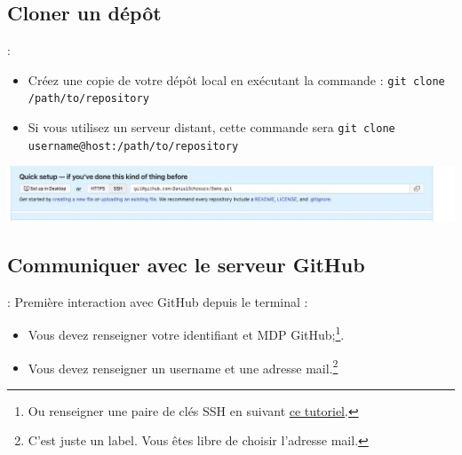 \documentclass[10pt]{beamer}
\begin{document}
\subsection{Cloner un dépôt}
\begin{frame}{\secname : \subsecname}
    \begin{itemize}
        \item Créez une copie de votre dépôt local en exécutant la commande :
              \lstinline[language=git]!git clone /path/to/repository!
        \item Si vous utilisez un serveur distant, cette commande sera
              \lstinline[language=git]!git clone username@host:/path/to/repository!
    \end{itemize}
    \centerline{\includegraphics[width=\textwidth]{img/GitHUbClone.jpg}}
\end{frame}

\subsection{Communiquer avec le serveur GitHub}
\begin{frame}{\secname : \subsecname}
    Première interaction avec GitHub depuis le terminal :
    \begin{itemize}
        \item Vous devez renseigner votre identifiant et MDP GitHub;\footnote{Ou renseigner une paire de clés SSH en suivant \href{https://docs.github.com/en/authentication/connecting-to-github-with-ssh}{ce tutoriel}.}.
        \item Vous devez renseigner un username et une adresse mail.\footnote{C’est juste un label. Vous êtes libre de choisir l’adresse mail.}
    \end{itemize}
\end{frame}

\end{document}
